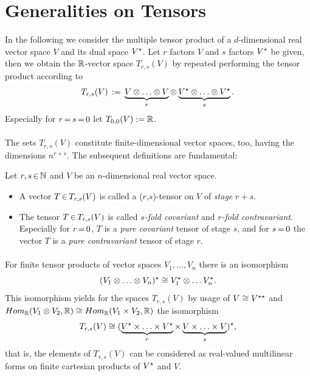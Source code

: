 \documentclass[11pt,twoside]{article}
\begin{document}
\section{Generalities on Tensors}
In the following we consider the multiple tensor product of a $d$-dimensional
real vector space $V$ and its dual space $V^\star$.
Let $r$ factors $V$ and $s$ factors $V^\star$ be given,
then we obtain the ${\mathbb{R}}$-vector space $T_{r,s}(V)$ by repeated performing
the tensor product according to
\[
T_{r,s}(V) \eqdef
\underbrace{{\multitens{V}   {V}   }}_r
\otimes
\underbrace{{\multitens{V^\*} {V^\*} }}_s.
\]
Especially for $r {\,=\,} s {\,=\,} 0$ let $T_{0,0}(V) := {\mathbb{R}}$.

\paragraph{}
The sets $T_{r,s}(V)$ constitute finite-dimensional vector spaces,
too,
having the dimensions $n^{r+s}$.
The subsequent definitions are fundamental:

\begin{definition}
Let $r,s {\,\in\,} {\mathbb{N}}$ and $V$ be an $n$-dimensional real vector space.

\begin{itemize}[leftmargin=15pt]
\item[1.]
A vector $T {\,\in\,} T_{r,s}(V)$ is called a ($r$,$s$)-tensor on $V$ 
of \textit{stage} $r+s$.
\item[2.]
The tensor $T {\,\in\,} T_{r,s}(V)$ is called $s$\textit{-fold covariant} and 
$r$\textit{-fold contravariant}.
Especially for $r {\,=\,} 0$, 
$T$ is a \textit{pure covariant} tensor of stage $s$, 
and for $s {\,=\,} 0$
the vector $T$ is a \textit{pure contravariant} tensor of stage $r$.
\end{itemize}
\end{definition}

\paragraph{}
For finite tensor products of vector spaces $V_1,\ldots,V_n$
there is an isomorphism
\[
(V_1 \otimes \ldots \otimes V_n)^\star \cong 
V_1^\star \otimes \ldots V_n^\star.
\]
This isomorphism yields for the spaces $T_{r,s}(V)$
by usage of $V \cong V^{\star\star}$ and 
$Hom_{{\mathbb{R}}}(V_1 \otimes V_2,{\mathbb{R}}) \cong Hom_{{\mathbb{R}}}(V_1 \times V_2,{\mathbb{R}})$
the isomorphism
\[
T_{r,s}(V) \cong
(\underbrace{V^\star \times \ldots \times V^\star}_r
 \times
 \underbrace{V    \times \ldots \times V   }_s)^\star,
\]
that is,
the elements of $T_{r,s}(V)$ can be considered as real-valued multilinear forms
on finite cartesian products of $V^\star$ and $V$.
\end{document}
